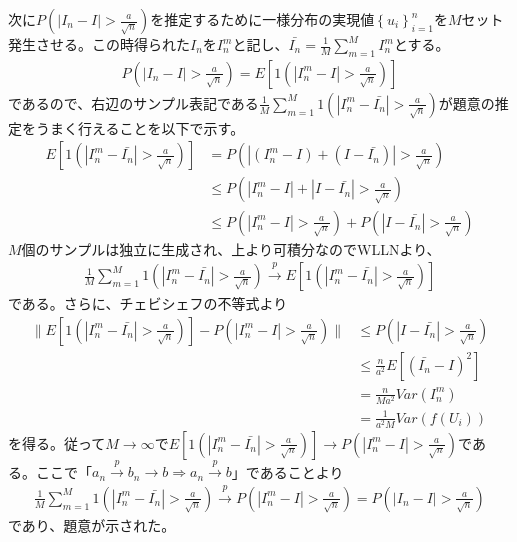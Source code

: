 \documentclass{article}
\begin{document}
次に$P\left( | I_n - I | > \frac{a}{\sqrt{n}} \right)$を推定するために一様分布の実現値$\left\{ u_i \right\}_{i=1}^n$を$M$セット発生させる。この時得られた$I_n$を$I_n^m$と記し、$\bar{I_n} = \frac{1}{M} \sum_{m=1}^M I_n^m$とする。
\begin{align*}
	P\left( | I_n - I | > \frac{a}{\sqrt{n}} \right) = E\left[ 1\left(  | I_n^m - I | > \frac{a}{\sqrt{n}} \right) \right]
\end{align*}
であるので、右辺のサンプル表記である$\frac{1}{M} \sum_{m=1}^M 1\left(  | I_n^m - \bar{I_n} | > \frac{a}{\sqrt{n}} \right)$が題意の推定をうまく行えることを以下で示す。
\begin{align*}
	E\left[ 1\left(  | I_n^m - \bar{I_n} | > \frac{a}{\sqrt{n}} \right) \right] &= P\left( | (I_n^m - I) + (I - \bar{I_n}) |  > \frac{a}{\sqrt{n}} \right) \\
	&\leq P\left( | I_n^m - I |+ |I - \bar{I_n}|  > \frac{a}{\sqrt{n}} \right)\\
	& \leq P\left( | I_n^m - I |> \frac{a}{\sqrt{n}} \right) + P\left( |I - \bar{I_n}|  > \frac{a}{\sqrt{n}} \right)
\end{align*}
$M$個のサンプルは独立に生成され、上より可積分なのでWLLNより、
\begin{align*}
\frac{1}{M} \sum_{m=1}^M 1\left(  | I_n^m - \bar{I_n} | > \frac{a}{\sqrt{n}} \right) \xrightarrow{p} E\left[ 1\left(  | I_n^m - \bar{I_n} | > \frac{a}{\sqrt{n}} \right) \right]
\end{align*}
である。さらに、チェビシェフの不等式より
\begin{align*}
	\| E\left[ 1\left(  | I_n^m - \bar{I_n} | > \frac{a}{\sqrt{n}} \right) \right] - P\left( | I_n^m - I |> \frac{a}{\sqrt{n}} \right)  \| &\leq P\left( |I - \bar{I_n}|  > \frac{a}{\sqrt{n}} \right)\\
	&\leq \frac{n}{a^2} E\left[ \left( \bar{I_n} - I \right)^2 \right]\\
	&= \frac{n}{Ma^2} Var\left(I_n^m \right)\\
	&= \frac{1}{a^2M} Var\left( f(U_i) \right)
\end{align*}
を得る。従って$M\to \infty$で$E\left[ 1\left(  | I_n^m - \bar{I_n} | > \frac{a}{\sqrt{n}} \right) \right] \to P\left( | I_n^m - I |> \frac{a}{\sqrt{n}} \right)$である。ここで「$a_n \xrightarrow{p} b_n \to b \Rightarrow a_n \xrightarrow{p} b$」であることより
\begin{align*}
	\frac{1}{M} \sum_{m=1}^M 1\left(  | I_n^m - \bar{I_n} | > \frac{a}{\sqrt{n}} \right) \xrightarrow{p} P\left( | I_n^m - I |> \frac{a}{\sqrt{n}} \right) = P\left( | I_n - I |> \frac{a}{\sqrt{n}} \right)
\end{align*}
であり、題意が示された。
\end{document}
